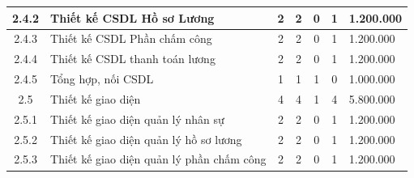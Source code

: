 \begin{longtable}{|c|p{3cm}|c|c|c|c|p{3cm}|}
    2.4.2                           & Thiết kế CSDL Hồ sơ Lương                                     & 2                                              & 2                                               & 0                                                               & 1                  & 1.200.000  \\ \hline
    2.4.3                           & Thiết kế CSDL Phần chấm công                                  & 2                                              & 2                                               & 0                                                               & 1                  & 1.200.000  \\ \hline
    2.4.4                           & Thiết kế CSDL thanh toán lương                                & 2                                              & 2                                               & 0                                                               & 1                  & 1.200.000  \\ \hline
    2.4.5                           & Tổng hợp, nối CSDL                                            & 1                                              & 1                                               & 1                                                               & 0                  & 1.000.000  \\ \hline
    2.5                             & Thiết kế giao diện                                            & 4                                              & 4                                               & 1                                                               & 4                  & 5.800.000  \\ \hline
    2.5.1                           & Thiết kế giao diện quản lý nhân sự                            & 2                                              & 2                                               & 0                                                               & 1                  & 1.200.000  \\ \hline
    2.5.2                           & Thiết kế giao diện quản lý hồ sơ lương                        & 2                                              & 2                                               & 0                                                               & 1                  & 1.200.000  \\ \hline
    2.5.3                           & Thiết kế giao diện quản lý phần chấm công                     & 2                                              & 2                                               & 0                                                               & 1                  & 1.200.000  \\ \hline

\end{longtable}

